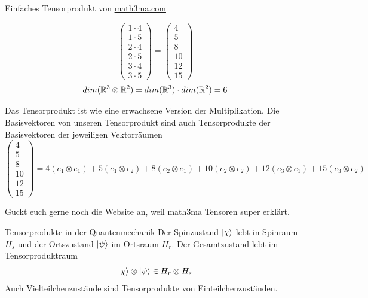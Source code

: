 \begin{Beispiel}{Einfaches Tensorprodukt von \href{https://www.math3ma.com/blog/the-tensor-product-demystified}{math3ma.com}}
\begin{enumerate}
{$$\begin{pmatrix}
        1\cdot 4 \\
        1\cdot 5\\
        2\cdot 4\\
        2\cdot 5\\
        3\cdot 4\\
        3\cdot 5
    \end{pmatrix}=\begin{pmatrix}
        4 \\
        5\\
        8\\
        10\\
        12\\
        15
    \end{pmatrix}$$
    $$dim(\mathbb{R}^3\otimes \mathbb{R}^2)=dim(\mathbb{R}^3)\cdot dim(\mathbb{R}^2)=6$$}
    \end{enumerate}
    Das Tensorprodukt ist wie eine erwachsene Version der Multiplikation. Die Basisvektoren von unseren Tensorprodukt sind auch Tensorprodukte der Basisvektoren der jeweiligen Vektorräumen
    $$\begin{pmatrix}
        4 \\
        5\\
        8\\
        10\\
        12\\
        15
    \end{pmatrix}= 4(e_1\otimes e_1) + 5(e_1\otimes e_2)+8(e_2\otimes e_1) + 10(e_2\otimes e_2) + 12(e_3\otimes e_1) + 15(e_3\otimes e_2)$$
\end{Beispiel}
Guckt euch gerne noch die Website an, weil math3ma Tensoren super erklärt.
\begin{Beispiel}{Tensorprodukte in der Quantenmechanik}
    Der Spinzustand $\ket{\chi}$ lebt in Spinraum $H_s$ und der Ortszustand $\ket{\psi}$ im Ortsraum $H_r$. Der Gesamtzustand lebt im Tensorproduktraum
    $$\ket{\chi}\otimes\ket{\psi} \in H_r\otimes H_s$$
    Auch Vielteilchenzustände sind Tensorprodukte von Einteilchenzuständen.
\end{Beispiel}
